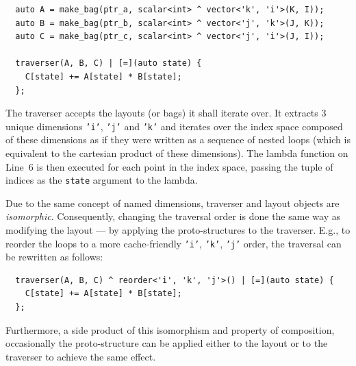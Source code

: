 \begin{verbatim}
  auto A = make_bag(ptr_a, scalar<int> ^ vector<'k', 'i'>(K, I));
  auto B = make_bag(ptr_b, scalar<int> ^ vector<'j', 'k'>(J, K));
  auto C = make_bag(ptr_c, scalar<int> ^ vector<'j', 'i'>(J, I));
  
  traverser(A, B, C) | [=](auto state) {
    C[state] += A[state] * B[state];
  };
\end{verbatim}
The traverser accepts the layouts (or bags) it shall iterate over. It extracts $3$ unique dimensions \texttt{'i'}, \texttt{'j'} and \texttt{'k'} and iterates over the index space composed of these dimensions as if they were written as a sequence of nested loops (which is equivalent to the cartesian product of these dimensions). The lambda function on Line~$6$ is then executed for each point in the index space, passing the tuple of indices as the \texttt{state} argument to the lambda. 

Due to the same concept of named dimensions, traverser and layout objects are \emph{isomorphic}. Consequently, changing the traversal order is done the same way as modifying the layout --- by applying the proto-structures to the traverser. E.g., to reorder the loops to a more cache-friendly \texttt{'i'}, \texttt{'k'}, \texttt{'j'} order, the traversal can be rewritten as follows:
\begin{verbatim}
  traverser(A, B, C) ^ reorder<'i', 'k', 'j'>() | [=](auto state) {
    C[state] += A[state] * B[state];
  };
\end{verbatim}
Furthermore, a side product of this isomorphism and property of composition, occasionally the proto-structure can be applied either to the layout or to the traverser to achieve the same effect.

